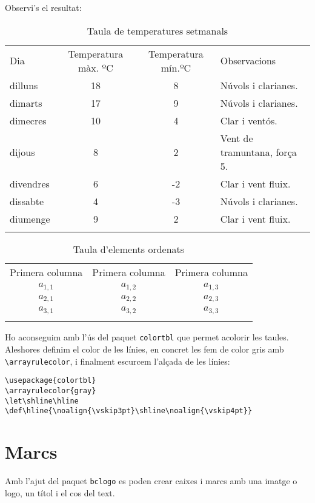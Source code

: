 \documentclass[a4paper,%
                             twoside,%
                             BCOR1.0cm,%
                             DIV11,%
                             parskip=full,%
                             11pt]{scrbook}
\let\shline\hline
\def\hline{\noalign{\vskip3pt}\shline\noalign{\vskip4pt}}
\begin{document}
Observi's el resultat:

\begin{table}[h]
\centering
\begin{tabular}{l|c|c|l}
\hline
Dia & Temperatura màx. ºC & Temperatura mín.ºC & Observacions \\
\hline
dilluns   & 18 & 8 & Núvols i clarianes. \\
dimarts   & 17 & 9 & Núvols i clarianes. \\
dimecres  & 10 & 4 & Clar i ventós. \\
dijous    &  8 & 2 & Vent de tramuntana, força 5. \\
divendres &  6 & -2 & Clar i vent fluix. \\
dissabte  & 4 & -3 & Núvols i clarianes. \\
diumenge  & 9 & 2 &  Clar i vent fluix. \\
\hline
\end{tabular}
\caption{Taula de temperatures setmanals}\label{tab:temp}
\end{table}

\begin{table}[h]
\centering
\begin{tabular}{c|c|c}
\hline
Primera columna & Primera columna & Primera columna \\
\hline
$a_{1,1}$ & $a_{1,2}$ & $a_{1,3}$ \\
$a_{2,1}$ & $a_{2,2}$ & $a_{2,3}$ \\
$a_{3,1}$ & $a_{3,2}$ & $a_{3,3}$ \\
\hline
\end{tabular}
\caption{Taula d'elements ordenats}\label{tab:ordre}
\end{table}

Ho aconseguim amb l'ús del paquet \verb+colortbl+ que permet acolorir les taules. Aleshores definim el color de les línies, en concret les fem de color gris amb \verb+\arrayrulecolor+, i finalment escurcem l'alçada de les línies:

\begin{verbatim}
\usepackage{colortbl}
\arrayrulecolor{gray}
\let\shline\hline
\def\hline{\noalign{\vskip3pt}\shline\noalign{\vskip4pt}}
\end{verbatim}

\section{Marcs}\label{sec:marcs}
Amb l'ajut del paquet \verb+bclogo+ es poden crear caixes i marcs amb una imatge o logo, un títol i el cos del text.
\end{document}
